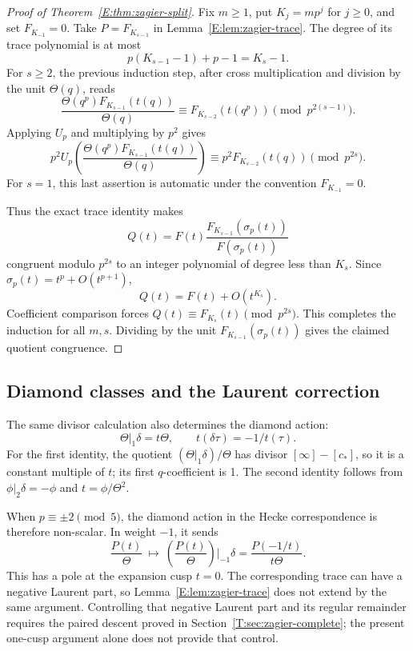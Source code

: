 \documentclass[11pt,a4paper]{article}
\theoremstyle{definition}\newtheorem{definition}[theorem]{Definition}
\theoremstyle{remark}\newtheorem{remark}[theorem]{Remark}
\numberwithin{equation}{section}
\begin{document}
\begin{proof}[Proof of Theorem~\ref{E:thm:zagier-split}]
Fix \(m\ge1\), put \(K_j=mp^j\) for \(j\ge0\), and set
\(F_{K_{-1}}=0\).  Take \(P=F_{K_{s-1}}\) in
Lemma~\ref{E:lem:zagier-trace}.  The degree of its trace polynomial
is at most
\[
 p(K_{s-1}-1)+p-1=K_s-1.
\]
For \(s\ge2\), the previous induction step, after
cross multiplication and division by the unit \(\Theta(q)\), reads
\[
 \frac{\Theta(q^p)F_{K_{s-1}}(t(q))}{\Theta(q)}
 \equiv F_{K_{s-2}}(t(q^p))\pmod{p^{2(s-1)}}.
\]
Applying \(U_p\) and multiplying by \(p^2\) gives
\[
 p^2U_p\left(
       \frac{\Theta(q^p)F_{K_{s-1}}(t(q))}{\Theta(q)}
       \right)
 \equiv p^2 F_{K_{s-2}}(t(q))\pmod{p^{2s}}.
\]
For \(s=1\), this last assertion is automatic under the
convention \(F_{K_{-1}}=0\).

Thus the exact trace identity makes
\[
 Q(t)=F(t)\frac{F_{K_{s-1}}(\sigma_p(t))}
                       {F(\sigma_p(t))}
\]
congruent modulo \(p^{2s}\) to an integer polynomial
of degree less than \(K_s\).
Since \(\sigma_p(t)=t^p+O(t^{p+1})\),
\[
 Q(t)=F(t)+O(t^{K_s}).
\]
Coefficient comparison forces
\(Q(t)\equiv F_{K_s}(t)\pmod{p^{2s}}\).
This completes the induction for all \(m,s\).
Dividing by the unit \(F_{K_{s-1}}(\sigma_p(t))\) gives
the claimed quotient congruence.
\end{proof}

\subsection{Diamond classes and the Laurent correction}

The same divisor calculation also determines the diamond action:
\begin{equation}\label{E:eq:zagier-diamond}
 \Theta|_1\delta=t\Theta,\qquad t(\delta\tau)=-1/t(\tau).
\end{equation}
For the first identity, the quotient
\((\Theta|_1\delta)/\Theta\) has divisor
\([\infty]-[c_*]\), so it is a constant multiple of \(t\);
its first \(q\)-coefficient is 1.  The second identity follows
from \(\phi|_2\delta=-\phi\) and \(t=\phi/\Theta^2\).

When \(p\equiv\pm2\pmod5\), the diamond action in the Hecke
correspondence is therefore non-scalar.  In weight \(-1\),
it sends
\[
 \frac{P(t)}{\Theta}
 \ \longmapsto\
 \left(\frac{P(t)}{\Theta}\right)\bigg|_{-1}\delta
 =\frac{P(-1/t)}{t\Theta}.
\]
This has a pole at the expansion cusp \(t=0\).
The corresponding trace can have a negative Laurent part,
so Lemma~\ref{E:lem:zagier-trace} does not extend by the same
argument. Controlling that negative Laurent part and its regular remainder requires the paired descent proved in Section~\ref{T:sec:zagier-complete}; the present one-cusp argument alone does not provide that control.
\end{document}

